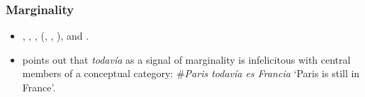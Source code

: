 \subsubsection{Marginality}
\label{appendixSpanishTodaviaMarginal}
\begin{itemize}
	\item \textcite{Bosque2016}, \textcite{Deloor2012}, \textcite{EderlyCurco2016}, \citeauthor{Garrido1991} (\citeyear{Garrido1991}, \citeyear{Garrido1992}, \citeyear{Garrido1993}), \textcite[§30.8ñ]{RAEGramatica} and \textcite{Trujillo1990}.
	\item \textcite{Deloor2012} points out that \textit{todavía} as a signal of marginality is infelicitous with central members of a conceptual category: \#\textit{Paris todavía es Francia} \lq Paris is still in France'.
\end{itemize}
